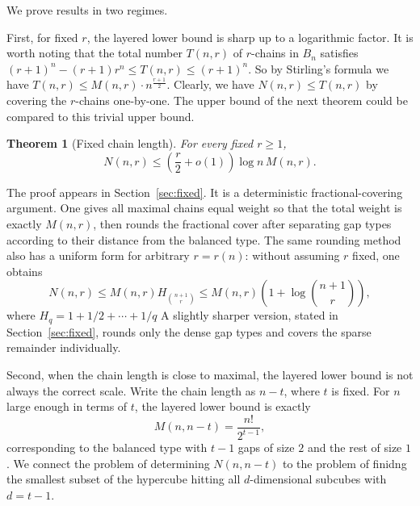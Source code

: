 \documentclass[11pt]{article}
\newtheorem{theorem}{Theorem}[section]
\theoremstyle{definition}
\theoremstyle{remark}
\begin{document}
We prove results in two regimes.

First, for fixed $r$, the layered lower bound is sharp up to a logarithmic factor. It is worth noting that the total number $T(n,r)$ of $r$-chains in $B_n$ satisfies $(r+1)^n-(r+1)r^n\le T(n,r)\le (r+1)^n$. So by Stirling's formula we have $T(n,r)\le M(n,r)\cdot n^{\frac{r+1}{2}}$. Clearly, we have $N(n,r)\le T(n,r)$ by covering the $r$-chains one-by-one. The upper bound of the next theorem could be compared to this trivial upper bound.

\begin{theorem}[Fixed chain length]\label{thm:fixed-r}
For every fixed $r\ge 1$,
\[
   N(n,r)\le
   \left(\frac r2+o(1)\right)\log n\,M(n,r).
\]
\end{theorem}
The proof appears in Section~\ref{sec:fixed}. It is a deterministic fractional-covering argument. One gives all maximal chains equal weight so that the total weight is exactly $M(n,r)$, then rounds the fractional cover after separating gap types according to their distance from the balanced type. The same rounding method also has a uniform form for arbitrary $r=r(n)$: without assuming $r$ fixed, one obtains
\[
N(n,r)\le M(n,r)H_{\binom{n+1}{r}}
\le M(n,r)\left(1+\log\binom{n+1}{r}\right),
\]
where $H_q=1+1/2+\cdots+1/q$ A slightly sharper version, stated in Section~\ref{sec:fixed}, rounds only the dense gap types and covers the sparse remainder individually.


Second, when the chain length is close to maximal, the layered lower bound is not always the correct scale.  Write the chain length as $n-t$, where $t$ is fixed.  For $n$ large enough in terms of $t$, the layered lower bound is exactly
\[
   M(n,n-t)=\frac{n!}{2^{t-1}},
\]
corresponding to the balanced type with $t-1$ gaps of size $2$ and the rest of size $1$.  We connect the problem of determining $N(n,n-t)$ to the problem of finidng the smallest subset of the hypercube hitting all $d$-dimensional subcubes with $d=t-1$.

\end{document}
